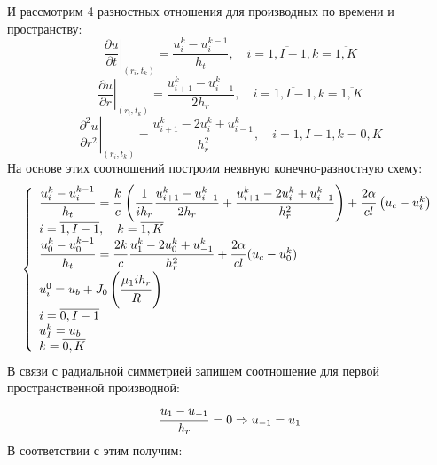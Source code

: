 \documentclass[a4paper,12pt,russian, fleqn]{extreport}
\begin{document}
	И рассмотрим 4 разностных отношения для производных по времени и пространству:	
	\begin{equation*}
	\left.\dfrac{\partial u}{\partial t}\right|_{(r_i,t_k)} = \dfrac{u_i^k-u_i^{k-1}}{h_t}, \quad i = \overline{1, I-1}, k = \overline{1,K}
	\end{equation*}	
	\begin{equation*}
	\left.\dfrac{\partial u}{\partial r}\right|_{(r_i, t_k)} = \dfrac{u_{i+1}^k - u_{i-1}^k}{2h_r}, \quad i = \overline{1,I-1}, k = \overline{1,K}
	\end{equation*}	
	\begin{equation*}
	\left.\dfrac{\partial^2 u}{\partial r^2}\right|_{(r_i, t_k)} = \dfrac{u_{i+1}^k - 2u_i^k + u_{i-1}^k}{h^2_r}, \quad i = \overline{1,I-1}, k = \overline{0,K}
	\end{equation*}
	На основе этих соотношений построим неявную конечно-разностную схему:
	\begin{equation*}
		\left\{\begin{array}{l}
			\dfrac{\strut u_i^{k}-u_i^{k-1}}{\strut h_t} = \dfrac{\strut k}{\strut c}\left(\dfrac{\strut 1}{\strut ih_r}\dfrac{\strut u_{i+1}^k - u_{i-1}^k}{\strut 2h_r} +\dfrac{\strut u_{i+1}^k - 2u_i^k + u_{i-1}^k}{\strut h^2_r}\right) + \dfrac{\strut 2\alpha}{\strut cl}\left (u_c - u_i^k \right) \\
			i = \overline{1,I-1}, \quad k = \overline{1,K}	 \\
			\dfrac{\strut u_0^{k}-u_0^{k-1}}{\strut h_t} = \dfrac{\strut 2k}{\strut c}\dfrac{\strut u_1^k-2u_0^k+u_{-1}^k}{\strut h_r^2} + \dfrac{\strut 2\alpha}{\strut cl}(u_c-u_0^k) \\
			u_i^0 = u_b + J_0\left( \dfrac{\strut \mu_1 ih_r}{\strut R} \right) \\
			i = \overline{0, I-1} \\
			u_I^k = u_b \\
		k = \overline{0,K}
	\end{array}\right.
	\end{equation*}
	В связи с радиальной симметрией запишем соотношение для первой пространственной производной:
	\begin{equation*}
		\dfrac{\strut u_1 - u_{-1}}{h_r} = 0 \Rightarrow u_{-1} = u_1
	\end{equation*}
	В соответствии с этим получим:
\end{document}
